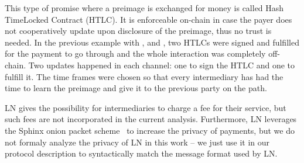     This type of promise where a preimage is exchanged for money is called Hash
    TimeLocked Contract (HTLC). It is enforceable on-chain in case the payer
    does not cooperatively update upon disclosure of the preimage, thus no trust
    is needed. In the previous example with \alice{}, \bob{} and \charlie, two
    HTLCs were signed and fulfilled for the payment to go through and the whole
    interaction was completely off-chain. Two updates happened in each channel:
    one to sign the HTLC and one to fulfill it. The time frames were chosen so
    that every intermediary has had the time to learn the preimage and give it
    to the previous party on the path.

    LN gives the possibility for intermediaries to charge a fee for their
    service, but such fees are not incorporated in the current analysis.
    Furthermore, LN leverages the Sphinx onion packet scheme~\cite{sphinx} to
    increase the privacy of payments, but we do not formaly analyze the privacy
    of LN in this work -- we just use it in our protocol description to
    syntactically match the message format used by LN.
